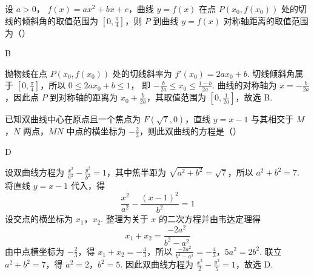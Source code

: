 \begin{problem}
设 \( a > 0 \)， \( f(x) = ax^{2} + bx + c \)，曲线 \( y = f(x) \) 在点 \( P(x_{0}, f(x_{0})) \) 处的切线的倾斜角的取值范围为 \( [0, \frac{\pi}{4}] \)，则 \(P\) 到曲线 \( y = f(x) \) 对称轴距离的取值范围为（\quad）
\begin{answer}
B
\end{answer}

\begin{solution}
抛物线在点 \(P(x_{0},f(x_{0}))\) 处的切线斜率为 \(f'(x_{0})=2ax_{0}+b\). 切线倾斜角属于 \(\left[0,\frac{\pi}{4}\right]\)，所以
\(0\leq2ax_{0}+b\leq1\)，
即 \(-\frac{b}{2a}\leq x_{0}\leq\frac{1-b}{2a}\). 曲线的对称轴为 \(x=-\frac{b}{2a}\)，因此点 \(P\) 到对称轴的距离为 \(x_{0}+\frac{b}{2a}\)，其取值范围为 \(\left[0,\frac{1}{2a}\right]\)，故选 B.
\end{solution}
\end{problem}

\begin{problem}
已知双曲线中心在原点且一个焦点为 \(F(\sqrt{7}, 0)\)，直线 \(y = x - 1\) 与其相交于 \(M\)，\(N\) 两点，\(MN\) 中点的横坐标为 \(-\frac{2}{3}\)，则此双曲线的方程是（\quad）
\begin{answer}
D
\end{answer}

\begin{solution}
设双曲线方程为 \(\frac{x^{2}}{a^{2}}-\frac{y^{2}}{b^{2}}=1\)，其中焦半距为 \(\sqrt{a^{2}+b^{2}}=\sqrt{7}\)，所以 \(a^{2}+b^{2}=7\). 将直线 \(y=x-1\) 代入，得
\[
\frac{x^{2}}{a^{2}}-\frac{(x-1)^{2}}{b^{2}}=1
\]
设交点的横坐标为 \(x_{1}\)，\(x_{2}\). 整理为关于 \(x\) 的二次方程并由韦达定理得
\[
x_{1}+x_{2}=\frac{-2a^{2}}{b^{2}-a^{2}}
\]
由中点横坐标为 \(-\frac{2}{3}\)，得 \(x_{1}+x_{2}=-\frac{4}{3}\)，所以
\(\frac{-2a^{2}}{b^{2}-a^{2}}=-\frac{4}{3}\)，\(5a^{2}=2b^{2}\).
联立 \(a^{2}+b^{2}=7\)，得 \(a^{2}=2\)，\(b^{2}=5\). 因此双曲线方程为 \(\frac{x^{2}}{2}-\frac{y^{2}}{5}=1\)，故选 D.
\end{solution}
\end{problem}

